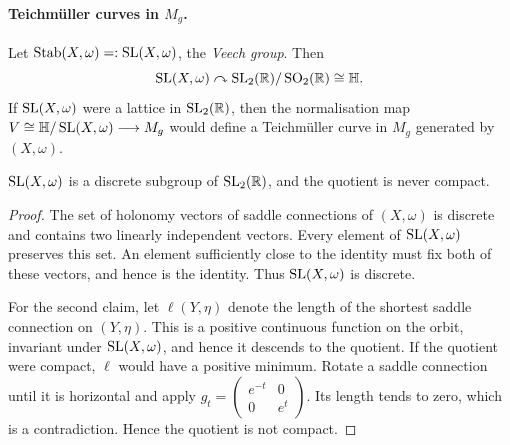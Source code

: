 \documentclass[11pt,a4paper]{article}
\begin{document}
\paragraph{Teichm\"uller curves in $M_g$.}
Let $\operatorname{Stab}(X,\omega)=:\operatorname{SL}(X,\omega)$, the \emph{Veech group}.
Then
\[
 \operatorname{SL}(X,\omega)\curvearrowright
 \operatorname{SL}_2(\mathbb R)/\operatorname{SO}_2(\mathbb R)\cong\mathbb H.
\]
If $\operatorname{SL}(X,\omega)$ were a lattice in $\operatorname{SL}_2(\mathbb R)$, then the
normalisation map
$V\cong\mathbb H/\operatorname{SL}(X,\omega)\longrightarrow M_g$
would define a Teichm\"uller curve in $M_g$ generated by $(X,\omega)$.

\setcounter{theorem}{8}\begin{proposition}
$\operatorname{SL}(X,\omega)$ is a discrete subgroup of $\operatorname{SL}_2(\mathbb R)$, and the
quotient is never compact.
\end{proposition}
\begin{proof}
The set of holonomy vectors of saddle connections of $(X,\omega)$ is
discrete and contains two linearly independent vectors. Every element of
$\operatorname{SL}(X,\omega)$ preserves this set. An element sufficiently close to the
identity must fix both of these vectors, and hence is the identity. Thus
$\operatorname{SL}(X,\omega)$ is discrete.

For the second claim, let $\ell(Y,\eta)$ denote the length of the shortest
saddle connection on $(Y,\eta)$. This is a positive continuous function on
the orbit, invariant under $\operatorname{SL}(X,\omega)$, and hence it descends to the
quotient. If the quotient were compact, $\ell$ would have a positive minimum.
Rotate a saddle connection until it is horizontal and apply
$g_t=\left(\begin{smallmatrix}e^{-t}&0\\0&e^t\end{smallmatrix}\right)$.
Its length tends to zero, which is a contradiction. Hence the quotient is not
compact.
\end{proof}
\end{document}
